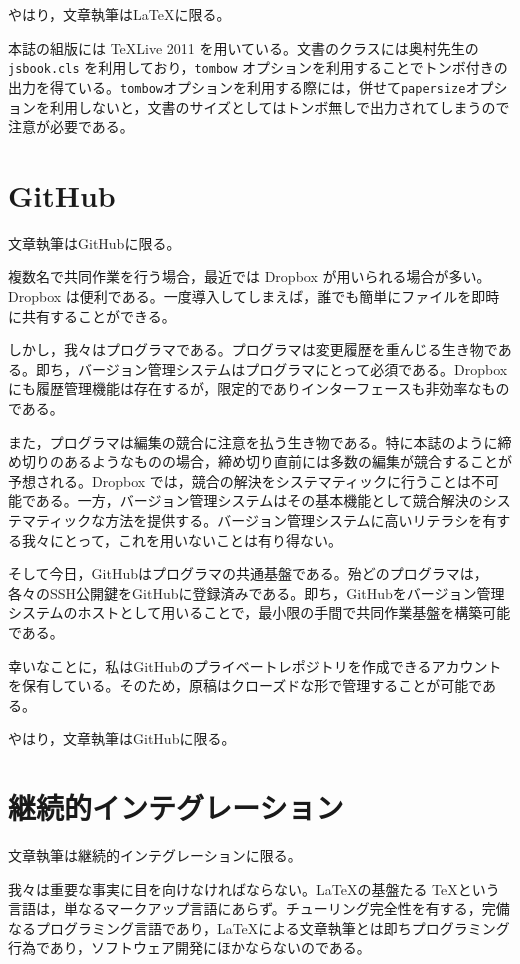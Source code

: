 やはり，文章執筆はLaTeXに限る。

本誌の組版には \TeX Live 2011 を用いている。文書のクラスには奥村先生の{\tt jsbook.cls} を利用しており，{\tt tombow} オプションを利用することでトンボ付きの出力を得ている。{\tt tombow}オプションを利用する際には，併せて{\tt papersize}オプションを利用しないと，文書のサイズとしてはトンボ無しで出力されてしまうので注意が必要である。

\section{GitHub}

文章執筆はGitHubに限る。

複数名で共同作業を行う場合，最近では Dropbox が用いられる場合が多い。Dropbox は便利である。一度導入してしまえば，誰でも簡単にファイルを即時に共有することができる。

しかし，我々はプログラマである。プログラマは変更履歴を重んじる生き物である。即ち，バージョン管理システムはプログラマにとって必須である。Dropboxにも履歴管理機能は存在するが，限定的でありインターフェースも非効率なものである。

また，プログラマは編集の競合に注意を払う生き物である。特に本誌のように締め切りのあるようなものの場合，締め切り直前には多数の編集が競合することが予想される。Dropbox では，競合の解決をシステマティックに行うことは不可能である。一方，バージョン管理システムはその基本機能として競合解決のシステマティックな方法を提供する。バージョン管理システムに高いリテラシを有する我々にとって，これを用いないことは有り得ない。

そして今日，GitHubはプログラマの共通基盤である。殆どのプログラマは，各々のSSH公開鍵をGitHubに登録済みである。即ち，GitHubをバージョン管理システムのホストとして用いることで，最小限の手間で共同作業基盤を構築可能である。

幸いなことに，私はGitHubのプライベートレポジトリを作成できるアカウントを保有している。そのため，原稿はクローズドな形で管理することが可能である。

やはり，文章執筆はGitHubに限る。

\section{継続的インテグレーション}

文章執筆は継続的インテグレーションに限る。

我々は重要な事実に目を向けなければならない。\LaTeX の基盤たる \TeX という言語は，単なるマークアップ言語にあらず。チューリング完全性を有する，完備なるプログラミング言語であり，\LaTeX による文章執筆とは即ちプログラミング行為であり，ソフトウェア開発にほかならないのである。


